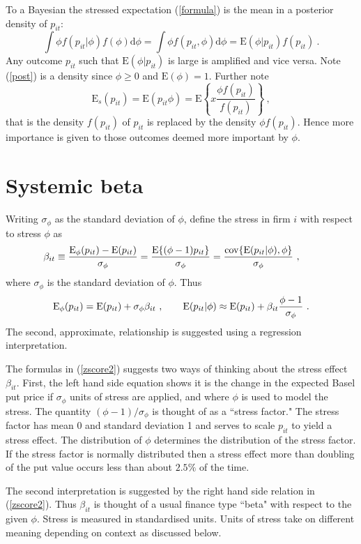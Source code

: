 \documentclass[authoryear]{elsarticle}
\newcommand{\E}{\mathrm{E}}
\newcommand{\cov}{\mathrm{cov}}
\newcommand{\de}{\mathrm{d}}
\newcommand{\eref}[1]{(\ref{#1})}
\newcommand{\cq}{\ , \qquad}
\newcommand{\be}[1]{\begin{equation}\label{#1}}
\newcommand{\ee}{\end{equation}}
\begin{document}
  To a Bayesian the stressed expectation \eref{formula}  is the mean in  a posterior density of $p_{it}$:
\be{post}
\int \phi f(p_{it}|\phi) f(\phi)\de \phi=\int \phi f(p_{it},\phi)\de \phi= \E(\phi|p_{it})f(p_{it})\ .
\ee
Any outcome $p_{it}$ such that $\E(\phi|p_{it})$ is large  is amplified and vice versa.  Note \eref{post} is a density since $\phi\ge 0$ and $\E(\phi)=1$.  Further note
$$
\E_s(p_{it}) = \E(p_{it}\phi) = \E\left\{x \frac{\phi f(p_{it})}{f(p_{it})}\right\}\ ,
$$
that is the density  $f(p_{it})$ of $p_{it}$  is replaced by  the density $\phi f(p_{it})$.  Hence more importance is given to those outcomes deemed more important by $\phi$. 


\section{Systemic beta}
Writing  $\sigma_{\phi}$ as the standard deviation of $\phi$,  define the stress in firm $i$ with respect to stress $\phi$ as
\be{zscore}
\beta_{it}\equiv \frac{\Es(p_{it})- \E(p_{it})}{\sigma_\phi}= \frac{\E\{(\phi-1)p_{it}\}}{\sigma_\phi}= \frac{ \cov\{\E(p_{it}|\phi),\phi\}}{\sigma_\phi} \cq
\ee
where  $\sigma_\phi$ is the standard deviation of $\phi$.  Thus
\be{zscore2}
\Es(p_{it}) = \E(p_{it}) + \sigma_\phi\beta_{it}\cq \E(p_{it}|\phi) \approx \E(p_{it}) + \beta_{it}\frac{\phi-1}{\sigma_\phi}\ .
\ee
The second, approximate, relationship is suggested using a regression interpretation.  

The formulas in \eref{zscore2} suggests two ways of  thinking about the  stress effect $\beta_{it}$.   First, the left hand side equation shows  it is the change in the expected Basel put price if  $\sigma_\phi$ units of stress are applied, and where $\phi$ is used to model the stress.  The quantity $(\phi-1)/\sigma_\phi$ is thought of as a ``stress factor."   The stress factor has mean 0 and standard deviation 1 and serves to scale  $p_{it}$ to yield a stress effect.  The distribution of $\phi$ determines the distribution of the stress factor. If the stress factor is normally distributed then a stress effect more than doubling of the put value  occurs less than about $2.5\%$ of the time.    

The second interpretation   is suggested by the  right hand side relation in \eref{zscore2}.   Thus  $\beta_{it}$ is thought of a usual finance type ``beta" with respect to the given $\phi$.   Stress is measured in standardised units.  Units of stress take on different meaning depending on  context as discussed below.  
\end{document}
